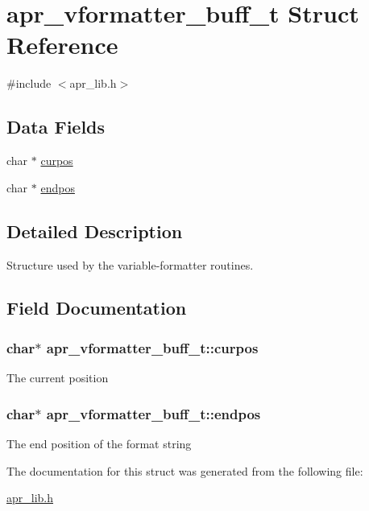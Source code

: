 \hypertarget{structapr__vformatter__buff__t}{}\section{apr\+\_\+vformatter\+\_\+buff\+\_\+t Struct Reference}
\label{structapr__vformatter__buff__t}


{\ttfamily \#include $<$apr\+\_\+lib.\+h$>$}

\subsection*{Data Fields}
\begin{DoxyCompactItemize}
\item 
char $\ast$ \hyperlink{structapr__vformatter__buff__t_aad69bb2ce382b39f55df6cc59039aee9}{curpos}
\item 
char $\ast$ \hyperlink{structapr__vformatter__buff__t_ab4884e759f4285c72df93e0d63022675}{endpos}
\end{DoxyCompactItemize}


\subsection{Detailed Description}
Structure used by the variable-\/formatter routines. 

\subsection{Field Documentation}
\subsubsection[{\texorpdfstring{curpos}{curpos}}]{\setlength{\rightskip}{0pt plus 5cm}char$\ast$ apr\+\_\+vformatter\+\_\+buff\+\_\+t\+::curpos}\hypertarget{structapr__vformatter__buff__t_aad69bb2ce382b39f55df6cc59039aee9}{}\label{structapr__vformatter__buff__t_aad69bb2ce382b39f55df6cc59039aee9}
The current position 
\subsubsection[{\texorpdfstring{endpos}{endpos}}]{\setlength{\rightskip}{0pt plus 5cm}char$\ast$ apr\+\_\+vformatter\+\_\+buff\+\_\+t\+::endpos}\hypertarget{structapr__vformatter__buff__t_ab4884e759f4285c72df93e0d63022675}{}\label{structapr__vformatter__buff__t_ab4884e759f4285c72df93e0d63022675}
The end position of the format string 

The documentation for this struct was generated from the following file\+:\begin{DoxyCompactItemize}
\item 
\hyperlink{apr__lib_8h}{apr\+\_\+lib.\+h}\end{DoxyCompactItemize}
